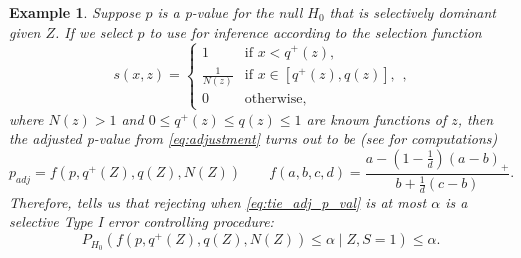 \documentclass{article}
\newtheorem{example}{Example}
\begin{document}
\begin{appendix}
\begin{example}
    \label{exm:rank_verification_exp_fam}
    Suppose $p$ is a p-value for the null $H_0$ that is selectively dominant given $Z$. If we select $p$ to use for inference according to the selection function 
    \begin{equation*}
        s(x, z) = 
        \begin{cases} 
        1 & \text{if } x < q^+(z), \\
        \frac{1}{N(z)} & \text{if } x \in [q^+(z), q(z)], \\
        0 & \text{otherwise},
        \end{cases},
    \end{equation*}
    where $N(z)> 1$ and $0 \leq q^{+}(z) \leq q(z) \leq 1$ are known functions of $z$, then the adjusted p-value from \eqref{eq:adjustment} turns out to be (see  for computations)
    \begin{equation}
            \label{eq:tie_adj_p_val}
            p_{adj} = f(p, q^+(Z), q(Z), N(Z)) \qquad f(a, b, c, d) =   \frac{a - (1 - \frac{1}{d})(a - b)_+}{b + \frac{1}{d}(c - b)}. 
     \end{equation}
    Therefore,  tells us that rejecting when \eqref{eq:tie_adj_p_val} is at most $\alpha$ is a selective Type I error controlling procedure:
    \begin{equation}
        \label{eq:tie_tool}
        P_{H_0}\left(f(p, q^+(Z), q(Z), N(Z))  \leq \alpha \mid Z, S = 1\right) \leq \alpha.  
    \end{equation} 


\end{example}
\end{appendix}
\end{document}
